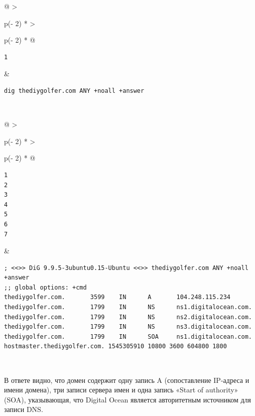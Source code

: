 \documentclass{report}
\begin{document}
\begin{longtable}[]{@{}
  >{\raggedright\arraybackslash}p{(\columnwidth - 2\tabcolsep) * }
  >{\raggedright\arraybackslash}p{(\columnwidth - 2\tabcolsep) * }@{}}
\toprule
\endhead
\begin{minipage}[t]{\linewidth}\raggedright
\begin{verbatim}
1
\end{verbatim}
\end{minipage} & \begin{minipage}[t]{\linewidth}\raggedright
\begin{verbatim}
dig thediygolfer.com ANY +noall +answer
\end{verbatim}
\end{minipage} \\ \addlinespace
\bottomrule
\end{longtable}

\begin{longtable}[]{@{}
  >{\raggedright\arraybackslash}p{(\columnwidth - 2\tabcolsep) * }
  >{\raggedright\arraybackslash}p{(\columnwidth - 2\tabcolsep) * }@{}}
\toprule
\endhead
\begin{minipage}[t]{\linewidth}\raggedright
\begin{verbatim}
1
2
3
4
5
6
7
\end{verbatim}
\end{minipage} & \begin{minipage}[t]{\linewidth}\raggedright
\begin{verbatim}
; <<>> DiG 9.9.5-3ubuntu0.15-Ubuntu <<>> thediygolfer.com ANY +noall +answer
;; global options: +cmd
thediygolfer.com.       3599    IN      A       104.248.115.234
thediygolfer.com.       1799    IN      NS      ns1.digitalocean.com.
thediygolfer.com.       1799    IN      NS      ns2.digitalocean.com.
thediygolfer.com.       1799    IN      NS      ns3.digitalocean.com.
thediygolfer.com.       1799    IN      SOA     ns1.digitalocean.com. hostmaster.thediygolfer.com. 1545305910 10800 3600 604800 1800
\end{verbatim}
\end{minipage} \\ \addlinespace
\bottomrule
\end{longtable}

В ответе видно, что домен содержит одну запись A (сопоставление
IP-адреса и имени домена), три записи сервера имен и одна запись «Start
of authority» (SOA), указывающая, что Digital Ocean является
авторитетным источником для записи DNS.
\end{document}
